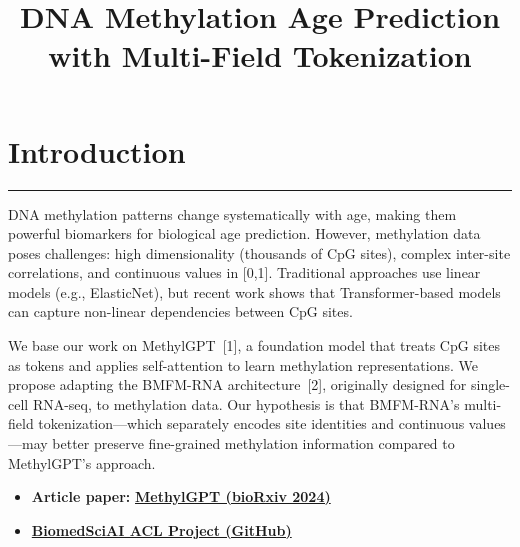 \documentclass[11pt]{article}
\title{DNA Methylation Age Prediction with Multi-Field Tokenization}
\date{}
\begin{document}
\maketitle

\section{Introduction}
\vspace{-0.3em}
\hrule
\vspace{0.8em}
DNA methylation patterns change systematically with age, making them powerful biomarkers for biological age prediction. However, methylation data poses challenges: high dimensionality (thousands of CpG sites), complex inter-site correlations, and continuous values in [0,1]. Traditional approaches use linear models (e.g., ElasticNet), but recent work shows that Transformer-based models can capture non-linear dependencies between CpG sites.

\noindent We base our work on MethylGPT~[1], a foundation model that treats CpG sites as tokens and applies self-attention to learn methylation representations. We propose adapting the BMFM-RNA architecture~[2], originally designed for single-cell RNA-seq, to methylation data. Our hypothesis is that BMFM-RNA's multi-field tokenization---which separately encodes site identities and continuous values---may better preserve fine-grained methylation information compared to MethylGPT's approach.

\begin{itemize}[leftmargin=1.5em]
\item \textbf{Article paper:} \href{https://www.biorxiv.org/content/10.1101/2024.10.30.621013v2}{\textbf{MethylGPT (bioRxiv 2024)}}
\item \href{https://github.com/netanelazran11/BiomedSciAI_ACL_Project/tree/main/methyl}{\textbf{BiomedSciAI ACL Project (GitHub)}}
\end{itemize}
\end{document}
